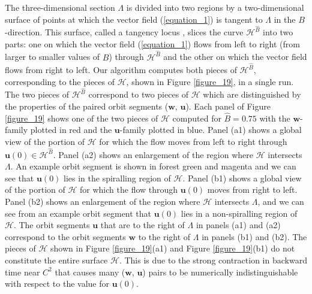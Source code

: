 \documentclass{ws-ijbc}
\begin{document}
The three-dimensional section $\Lambda$ is divided into two regions by a two-dimensional surface of points at which the vector field (\ref{equation_1}) is tangent to $\Lambda$ in the $B$-direction.  This surface, called a tangency locus \cite{tangency_locus_paper}, slices the curve $\mathscr{H}^{\widehat{B}}$ into two parts: one on which the vector field (\ref{equation_1}) flows from left to right (from larger to smaller values of $B$) through $\mathscr{H}^{\widehat{B}}$ and the other on which the vector field flows from right to left.  Our algorithm computes both pieces of $\mathscr{H}^{\widehat{B}}$, corresponding to the pieces of $\mathscr{H}$, shown in Figure \ref{figure_19}, in a single run.  The two pieces of $\mathscr{H}^{\widehat{B}}$ correspond to two pieces of $\mathscr{H}$ which are distinguished by the properties of the paired orbit segments ($\mathbf{w}$, $\mathbf{u}$).  Each panel of Figure \ref{figure_19} shows one of the two pieces of $\mathscr{H}$ computed for $\widehat{B}=0.75$ with the $\mathbf{w}$-family plotted in red and the $\mathbf{u}$-family plotted in blue.  Panel (a1) shows a global view of the portion of $\mathscr{H}$ for which the flow moves from left to right through $\mathbf{u}(0) \in \mathscr{H}^{\widehat{B}}$.  Panel (a2) shows an enlargement of the region where $\mathscr{H}$ intersects $\Lambda$.  An example orbit segment is shown in forest green and magenta and we can see that $\mathbf{u}(0)$ lies in the spiralling region of $\mathscr{H}$. Panel (b1) shows a global view of the portion of $\mathscr{H}$ for which the flow through $\mathbf{u}(0)$ moves from right to left.  Panel (b2) shows an enlargement of the region where $\mathscr{H}$ intersects $\Lambda$, and we can see from an example orbit segment that $\mathbf{u}(0)$ lies in a non-spiralling region of $\mathscr{H}$.  The orbit segments $\mathbf{u}$ that are to the right of $\Lambda$ in panels (a1) and (a2) correspond to the orbit segments $\mathbf{w}$ to the right of $\Lambda$ in panels (b1) and (b2).  The pieces of $\mathscr{H}$ shown in Figure \ref{figure_19}(a1) and Figure \ref{figure_19}(b1) do not constitute the entire surface $\mathscr{H}$.  This is due to the strong contraction in backward time near $C^2$ that causes many ($\mathbf{w}$, $\mathbf{u}$) pairs to be numerically indistinguishable with respect to the value for $\mathbf{u}(0)$.
\end{document}
